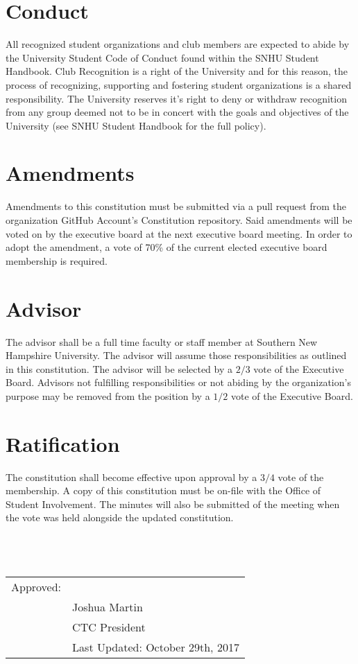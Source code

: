 \documentclass{article}
\newcommand{\datechanged}{Last Updated: October 29th, 2017}
\newcommand{\article}[1]{\section{#1} \label{#1}}
\begin{document}
\article{Conduct}
All recognized student organizations and club members are expected to abide by the University Student Code of Conduct found within the SNHU Student Handbook. 
Club Recognition is a right of the University and for this reason, the process of recognizing, supporting and fostering student organizations is a shared responsibility. 
The University reserves it's right to deny or withdraw recognition from any group deemed not to be in concert with the goals and objectives of the University (see SNHU Student Handbook for the full policy).

\article{Amendments}
Amendments to this constitution must be submitted via a pull request from the organization GitHub Account's Constitution repository. 
Said amendments will be voted on by the executive board at the next executive board meeting. 
In order to adopt the amendment, a vote of 70\% of the current elected executive board membership is required.

\article{Advisor}
The advisor shall be a full time faculty or staff member at Southern New Hampshire University. 
The advisor will assume those responsibilities as outlined in this constitution. 
The advisor will be selected by a $2/3$ vote of the Executive Board. 
Advisors not fulfilling responsibilities or not abiding by the organization's purpose may be removed from the position by a $1/2$ vote of the Executive Board.

\article{Ratification}
The constitution shall become effective upon approval by a $3/4$ vote of the membership. 
A copy of this constitution must be on-file with the Office of Student Involvement. 
The minutes will also be submitted of the meeting when the vote was held alongside the updated constitution.\\ \\ \\ \\

\begin{tabular}{@{}p{.5in}p{4in}@{}}
Approved: & \hrulefill \\
& Joshua Martin \\
& CTC President\\
& \datechanged
\end{tabular}
\end{document}
